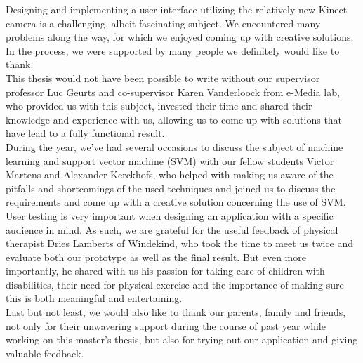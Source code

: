 Designing and implementing a user interface utilizing the relatively new Kinect camera is a challenging, albeit fascinating subject. We encountered many problems along the way, for which we enjoyed coming up with creative solutions. In the process, we were supported by many people we definitely would like to thank.\\

This thesis would not have been possible to write without our supervisor professor Luc Geurts and co-supervisor Karen Vanderloock from e-Media lab, who provided us with this subject, invested their time and shared their knowledge and experience with us, allowing us to come up with solutions that have lead to a fully functional result.\\

During the year, we've had several occasions to discuss the subject of machine learning and support vector machine (SVM) with our fellow students Victor Martens and Alexander Kerckhofs, who helped with making us aware of the pitfalls and shortcomings of the used techniques and joined us to discuss the requirements and come up with a creative solution concerning the use of SVM.\\

User testing is very important when designing an application with a specific audience in mind. As such, we are grateful for the useful feedback of physical therapist Dries Lamberts of Windekind, who took the time to meet us twice and evaluate both our prototype as well as the final result. But even more importantly, he shared with us his passion for taking care of children with disabilities, their need for physical exercise and the importance of making sure this is both meaningful and entertaining.\\

Last but not least, we would also like to thank our parents, family and friends, not only for their unwavering support during the course of past year while working on this master's thesis, but also for trying out our application and giving valuable feedback.